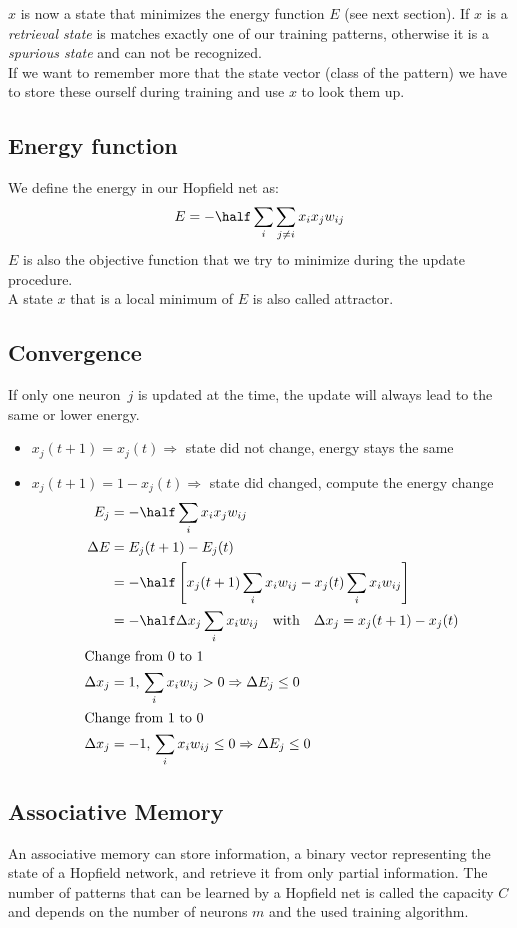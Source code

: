 $x$ is now a state that minimizes the energy function $E$ (see next section). If $x$ is a \emph{retrieval state} is matches exactly one of our training patterns, otherwise it is a \emph{spurious state} and can not be recognized.\\
If we want to remember more that the state vector (\eg class of the pattern) we have to store these ourself during training and use $x$ to look them up.

\subsection{Energy function}
We define the energy in our Hopfield net as:
\begin{equation}
E = -\half \sum_i \sum_{j\neq i} x_i x_j w_{ij}
\end{equation}
$E$ is also the objective function that we try to minimize during the update procedure.\\
A state $x$ that is a local minimum of $E$ is also called attractor.

\subsection{Convergence}
If only one neuron~$j$ is updated at the time, the update will always lead to the same or lower energy.
\begin{itemize}
\item $x_j(t+1) = x_j(t) \Rightarrow$ state did not change, energy stays the same
\item $x_j(t+1) = 1 - x_j(t) \Rightarrow$ state did changed, compute the energy change
	\begin{align}
	E_j &= -\half \sum_i x_i x_j w_{ij}\\
	\Delta E &= E_j(t+1) - E_j(t)\\
	&= -\half \left[ x_j(t+1) \sum_i x_i w_{ij} - x_j(t) \sum_i x_i w_{ij} \right]\\
	&= -\half \Delta x_j \sum_i x_i w_{ij} \quad\text{with}\quad	\Delta x_j = x_j(t+1) - x_j(t)\\
	\intertext{Change from 0 to 1}
	\Delta x_j &= 1,\,\sum_i x_i w_{ij} > 0 \Rightarrow \Delta E_j \leq 0\\
	\intertext{Change from 1 to 0}
	\Delta x_j &= -1,\,\sum_i x_i w_{ij} \leq 0 \Rightarrow \Delta E_j \leq 0
	\end{align}
\end{itemize}

\subsection{Associative Memory}
An associative memory can store information, \eg a binary vector representing the state of a Hopfield network, and retrieve it from only partial information. The number of patterns that can be learned by a Hopfield net is called the capacity $C$ and depends on the number of neurons $m$ and the used training algorithm.

